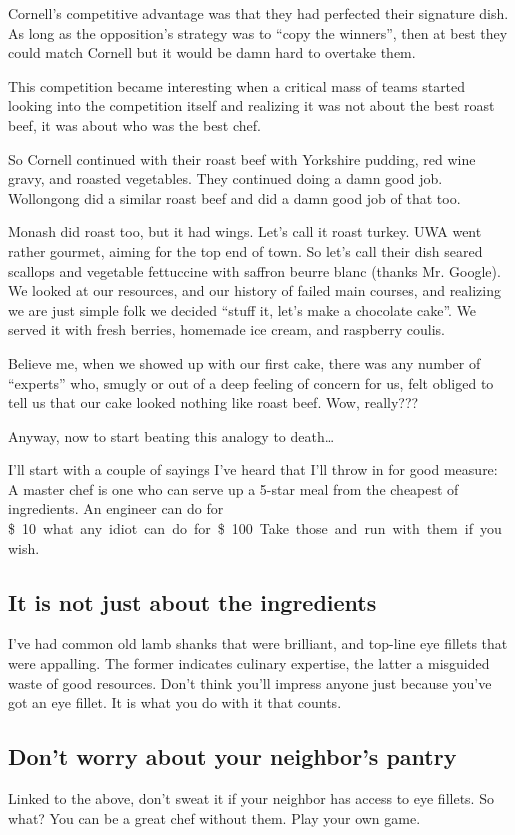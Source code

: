 \documentclass[10pt, a4paper, article, oneside, twocolumn, final]{memoir}
\begin{document}
Cornell’s competitive advantage was that they had perfected their signature dish. As long as the opposition’s strategy was to “copy the winners”, then at best they could match Cornell but it would be damn hard to overtake them. 

This competition became interesting when a critical mass of teams started looking into the competition itself and realizing it was not about the best roast beef, it was about who was the best chef. 

So Cornell continued with their roast beef with Yorkshire pudding, red wine gravy, and roasted vegetables. They continued doing a damn good job. Wollongong did a similar roast beef and did a damn good job of that too. 

Monash did roast too, but it had wings. Let’s call it roast turkey. UWA went rather gourmet, aiming for the top end of town. So let's call their dish seared scallops and vegetable fettuccine with saffron beurre blanc (thanks Mr. Google). We looked at our resources, and our history of failed main courses, and realizing we are just simple folk we decided “stuff it, let’s make a chocolate cake”. We served it with fresh berries, homemade ice cream, and raspberry coulis. 

Believe me, when we showed up with our first cake, there was any number of “experts” who, smugly or out of a deep feeling of concern for us, felt obliged to tell us that our cake looked nothing like roast beef. Wow, really??? 

Anyway, now to start beating this analogy to death\ldots 

I’ll start with a couple of sayings I’ve heard that I’ll throw in for good measure: A master chef is one who can serve up a 5-star meal from the cheapest of ingredients. An engineer can do for \SI{10}[\$] what any idiot can do for \SI{100}[\$]. Take those and run with them if you wish. 

\subsection*{It is not just about the ingredients}
I’ve had common old lamb shanks that were brilliant, and top-line eye fillets that were appalling. The former indicates culinary expertise, the latter a misguided waste of good resources. Don’t think you’ll impress anyone just because you’ve got an eye fillet. It is what you do with it that counts. 

\subsection*{Don’t worry about your neighbor’s pantry}
Linked to the above, don’t sweat it if your neighbor has access to eye fillets. So what? You can be a great chef without them. Play your own game. 
\end{document}
